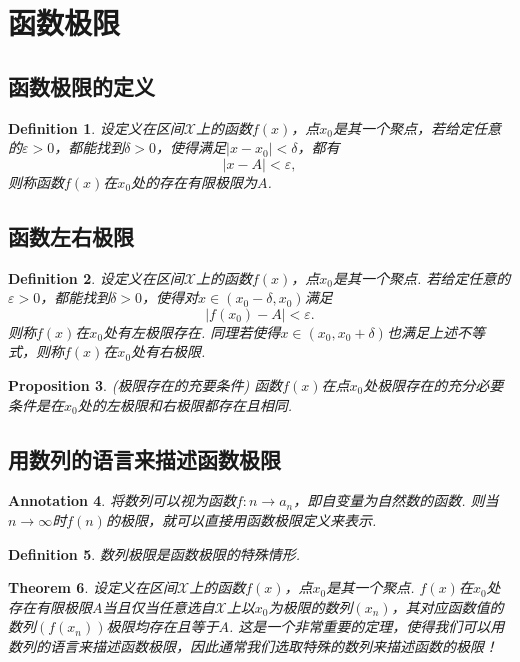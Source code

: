 \documentclass{article}
\newtheorem{theorem}{Theorem}[section]
\newtheorem{proposition}[theorem]{Proposition}
\newtheorem{definition}[theorem]{Definition}
\newtheorem{annotation}[theorem]{Annotation}
\begin{document}
\newpage
\section{函数极限}

\subsection{函数极限的定义}

\begin{definition}
\rm 设定义在区间$\mathcal{X}$上的函数$f(x)$，点$x_0$是其一个聚点，若给定任意的$\varepsilon  > 0$，都能找到$\delta > 0$，使得满足$|x-x_0| < \delta$，都有
$$
|x-A| < \varepsilon,
$$
则称函数$f(x)$在$x_0$处的存在有限极限为$A$.
\end{definition}

\subsection{函数左右极限}
\begin{definition}
\rm 设定义在区间$\mathcal{X}$上的函数$f(x)$，点$x_0$是其一个聚点. 若给定任意的$\varepsilon > 0$，都能找到$\delta > 0$，使得对$x \in (x_0-\delta,x_0)$满足
$$
|f(x_0)-A| < \varepsilon.
$$
则称$f(x)$在$x_0$处有{\color{red}左极限}存在. 同理若使得$x \in (x_0,x_0 +\delta)$也满足上述不等式，则称$f(x)$在$x_0$处有{\color{red}右极限}.
\end{definition}

\begin{proposition}
\rm {\color{red} (极限存在的充要条件) }函数$f(x)$在点$x_0$处极限存在的充分必要条件是在$x_0$处的左极限和右极限都存在且相同.
\end{proposition}

\subsection{用数列的语言来描述函数极限}

\begin{annotation}
\rm  将数列可以视为函数$f : n \to a_n$，即自变量为自然数的函数. 则当$n \to \infty$时$f(n)$的极限，就可以直接用函数极限定义来表示.  
\end{annotation}

\begin{definition}
\rm 数列极限是函数极限的特殊情形. 
\end{definition}

\begin{theorem}
\rm 设定义在区间$\mathcal{X}$上的函数$f(x)$，点$x_0$是其一个聚点. $f(x)$在$x_0$处存在有限极限$A$当且仅当任意选自$\mathcal{X}$上以$x_0$为极限的数列$(x_n)$，其对应函数值的数列$(f(x_n))$极限均存在且等于$A$. {\color{red} 这是一个非常重要的定理，使得我们可以用数列的语言来描述函数极限，因此通常我们选取特殊的数列来描述函数的极限！}
\end{theorem}
\end{document}
